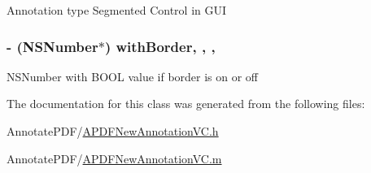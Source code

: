 Annotation type Segmented Control in G\-U\-I \hypertarget{interface_a_p_d_f_new_annotation_v_c_a15b2901fa1fa2caa4e405c858f47f723}{
\subsubsection[{with\-Border}]{\setlength{\rightskip}{0pt plus 5cm}-\/ (N\-S\-Number$\ast$) with\-Border\hspace{0.3cm}{\ttfamily [read]}, {\ttfamily [write]}, {\ttfamily [nonatomic]}, {\ttfamily [retain]}}}\label{interface_a_p_d_f_new_annotation_v_c_a15b2901fa1fa2caa4e405c858f47f723}
N\-S\-Number with B\-O\-O\-L value if border is on or off 

The documentation for this class was generated from the following files\-:\begin{DoxyCompactItemize}
\item 
Annotate\-P\-D\-F/\hyperlink{_a_p_d_f_new_annotation_v_c_8h}{A\-P\-D\-F\-New\-Annotation\-V\-C.\-h}\item 
Annotate\-P\-D\-F/\hyperlink{_a_p_d_f_new_annotation_v_c_8m}{A\-P\-D\-F\-New\-Annotation\-V\-C.\-m}\end{DoxyCompactItemize}

